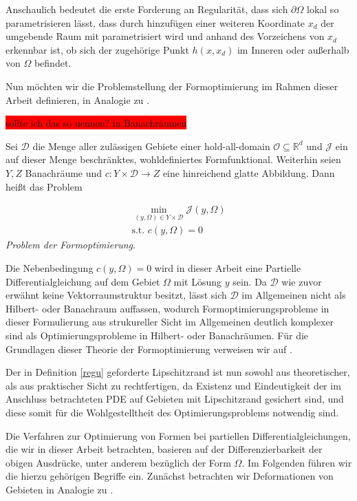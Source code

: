 Anschaulich bedeutet die erste Forderung an Regularität, dass sich $\partial\Omega$ lokal so parametrisieren lässt, dass durch hinzufügen einer weiteren Koordinate $x_d$ der umgebende Raum mit parametrisiert wird und anhand des Vorzeichens von $x_d$ erkennbar ist, ob sich der zugehörige Punkt $h(x,x_d)$ im Inneren oder außerhalb von $\Omega$ befindet.

Nun möchten wir die Problemstellung der Formoptimierung im Rahmen dieser Arbeit definieren, in Analogie zu \cite{LagrangeNewton}.

\colorbox{red}{sollte ich das so nennen? in Banachräumen}
\begin{defi}
Sei $\mathcal{D}$ die Menge aller zulässigen Gebiete einer hold-all-domain $\mathcal{O}\subseteq\mathbb{R}^d$ und $\mathcal{J}$ ein auf dieser Menge beschränktes, wohldefiniertes Formfunktional. Weiterhin seien $Y,Z$ Banachräume und $c: Y\times \mathcal{D} \rightarrow Z$ eine hinreichend glatte Abbildung. Dann heißt das Problem

\begin{align*}
	\underset{(y,\Omega) \in Y \times \mathcal{D}}{\min} \mathcal{J}(y,\Omega) \\
	\text{s.t. } c(y, \Omega) = 0
\end{align*}
\textit{Problem der Formoptimierung}.
\end{defi}

Die Nebenbedingung $c(y, \Omega) = 0$ wird in dieser Arbeit eine Partielle Differentialgleichung auf dem Gebiet $\Omega$ mit Lösung $y$ sein. Da $\mathcal{D}$ wie zuvor erwähnt keine Vektorraumstruktur besitzt, lässt sich $\mathcal{D}$ im Allgemeinen nicht als Hilbert- oder Banachraum auffassen, wodurch Formoptimierungsprobleme in dieser Formulierung aus strukureller Sicht im Allgemeinen deutlich komplexer sind als Optimierungsprobleme in Hilbert- oder Banachräumen. Für die Grundlagen dieser Theorie der Formoptimierung verweisen wir auf \cite{shape_space}.

Der in Definition \ref{regu} geforderte Lipschitzrand ist nun sowohl aus theoretischer, als aus praktischer Sicht zu rechtfertigen, da Existenz und Eindeutigkeit der im Anschluss betrachteten PDE auf Gebieten mit Lipschitzrand gesichert sind, und diese somit für die Wohlgestelltheit des Optimierungsproblems notwendig sind. 

Die Verfahren zur Optimierung von Formen bei partiellen Differentialgleichungen, die wir in dieser Arbeit betrachten, basieren auf der Differenzierbarkeit der obigen Ausdrücke, unter anderem bezüglich der Form $\Omega$. Im Folgenden führen wir die hierzu gehörigen Begriffe ein. Zunächst betrachten wir Deformationen von Gebieten in Analogie zu \cite{bfgs2}.

